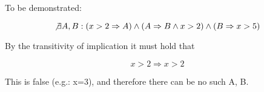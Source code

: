To be demonstrated:

$$ \not\exists A,B: (x>2 \Rightarrow A) \land (A \Rightarrow B \land x>2) \land (B \Rightarrow x>5) $$

By the transitivity of implication it must hold that

$$ x>2 \Rightarrow x>2 $$

This is false (e.g.: x=3), and therefore there can be no such A, B.

\iffalse

x>2↦A
A↦B
B↦x>5

Transitiv muss also gelten:

x>2↦x>5

und das ist nicht korrekt für x=3.

(x>2↦A)∧(A↦B∧x>2)∧(B↦x>5)

C==x>2
D==x>5

D↦C

(C↦A)∧(A↦B∧C)∧(B↦D)∧(D↦C)∧~(C↦D)

(~C∨A)∧(~A∨(B∧C))∧(~B∨D)∧(~D∨C)∧(~D∨C)∧~(~C∨D)
(~C∨A)∧(~A∨B)∧(~A∨C)∧(~B∨D)∧(~D∨C)∧(~D∨C)∧C∧(~D)

{{~C,A},{~A,B},{~A,C},{~B,D},{~D,C},{C},{~D}}
OLR auf C:
{{A},{~A,B},{~B,D},{~D}}
OLR auf ~D:
{{A},{~A,B},{~B}
OLR auf A:
{{B},{~B}}
OLR auf B:
{{}}

Daher falsch.
\fi
\bye

